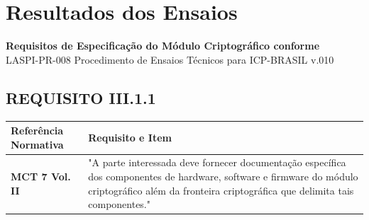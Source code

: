 \documentclass[12pt, a4paper]{article}
\begin{document}
\newpage

\section{Resultados dos Ensaios}

\begin{center}
    {\large\textbf{Requisitos de Especificação do Módulo Criptográfico conforme}} \\
    {\small LASPI-PR-008 Procedimento de Ensaios Técnicos para ICP-BRASIL v.010}
\end{center}
\vspace{0.5cm} %




\subsection{REQUISITO III.1.1} 
    
    
    \begin{tabularx}{\textwidth}{l X} 
    \toprule
    
    \textbf{Referência Normativa} & \textbf{Requisito e Item} \\ 
    \midrule
    
    \rowcolor{gray!15} %
    
    \textbf{MCT 7 Vol. II} & 
    "A parte interessada deve fornecer documentação específica dos componentes de hardware, software e firmware do módulo criptográfico além da fronteira criptográfica que delimita tais componentes." \\
    \bottomrule
    \end{tabularx}
    
    \vspace{1cm} 
    
\end{document}
